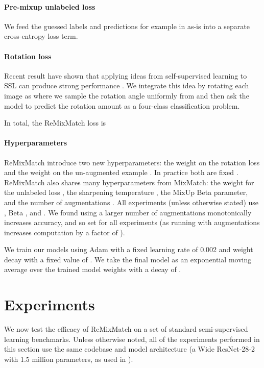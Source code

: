 \documentclass{article} \usepackage{iclr2020_conference,times}
\begin{document}
\paragraph{Pre-mixup unlabeled loss} We feed the guessed labels and predictions for example in  as-is into a separate cross-entropy loss term.

\paragraph{Rotation loss} Recent result have shown that applying ideas from self-supervised learning to SSL can produce strong performance \citep{gidaris2018unsupervised,zhai2019s}.
We integrate this idea by rotating each image  as  where we sample the rotation angle  uniformly from  and then ask the model to predict the rotation amount as a four-class classification problem.


In total, the ReMixMatch loss is



\paragraph{Hyperparameters} ReMixMatch introduce two new hyperparameters: 
the weight on the rotation loss  and
the weight on the un-augmented example .
In practice both are fixed 
.
ReMixMatch also shares many hyperparameters from MixMatch:
the weight for the unlabeled loss ,
the sharpening temperature ,
the MixUp Beta parameter,
and the number of augmentations .
All experiments (unless otherwise stated) use , Beta , and .
We found using a larger number of augmentations monotonically
increases accuracy, and so set  for all experiments (as running
with  augmentations increases computation by a factor of ).

We train our models using Adam
\citep{kingma2014adam} with a fixed learning rate of 0.002 and weight decay \citep{zhang2018three} with a
fixed value of .
We take the final model as an exponential moving average over the trained model weights
with a decay of .




\section{Experiments}
\label{sec:experiments}

We now test the efficacy of ReMixMatch on a set of standard semi-supervised learning
benchmarks. 
Unless otherwise noted, all of the experiments performed in this section
use the same codebase and model architecture (a Wide ResNet-28-2 \citep{zagoruyko2016wide} with 1.5 million parameters, as used in \citep{oliver2018realistic}).
\end{document}
